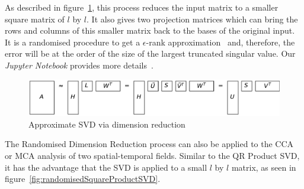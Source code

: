 \documentclass{acm_proc_article-sp}
\begin{document}
As described in figure~\ref{fig:reduceSizeRandomisedSquare}, this process reduces the input matrix to a smaller square matrix of $l$ by $l$. It also gives two projection matrices which can bring the rows and columns of this smaller matrix back to the bases of the original input. It is a randomised procedure to get a $\epsilon$-rank approximation~\cite{Martinsson2016} and, therefore, the error will be at the order of the size of the largest truncated singular value. Our \textit{Jupyter Notebook} provides more details~\cite{Bogaardt2018}.

\begin{figure}[h]
\begin{center}
\includegraphics[width=\columnwidth]{Results/reduceSizeRandomisedSquare.pdf}
\caption[Approximate randomised SVD]{Approximate SVD via dimension reduction}
\label{fig:reduceSizeRandomisedSquare}
\end{center}
\end{figure}
The Randomised Dimension Reduction process can also be applied to the CCA or MCA analysis of two spatial-temporal fields. Similar to the QR Product SVD, it has the advantage that the SVD is applied to a small $l$ by $l$ matrix, as seen in figure~\ref{fig:randomisedSquareProductSVD}.
\end{document}

